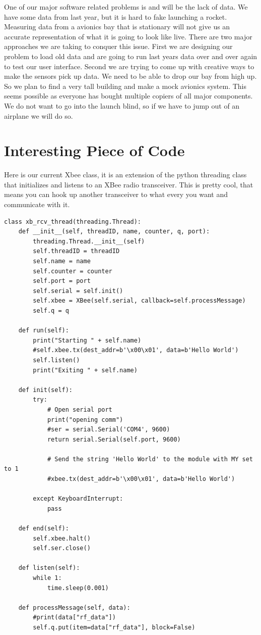 \documentclass[10pt,draftclsnofoot,onecolumn]{IEEEtran}
\begin{document}
One of our major software related problems is and will be the lack of data. We have some data from last year, but it is hard to fake launching a rocket. Measuring data from a avionics bay that is stationary will not give us an accurate representation of what it is going to look like live. There are two major approaches we are taking to conquer this issue. First we are designing our problem to load old data and are going to run last years data over and over again to test our user interface. Second we are trying to come up with creative ways to make the sensors pick up data. We need to be able to drop our bay from high up. So we plan to find a very tall building and make a mock avionics system. This seems possible as everyone has bought multiple copiers of all major components. We do not want to go into the launch blind, so if we have to jump out of an airplane we will do so. \par

\section{Interesting Piece of Code}
Here is our current Xbee class, it is an extension of the python threading class that initializes and listens to an XBee radio transceiver. This is pretty cool, that means you can hook up another transceiver to what every you want and communicate with it. \par

\begin{lstlisting}
class xb_rcv_thread(threading.Thread):
    def __init__(self, threadID, name, counter, q, port):
        threading.Thread.__init__(self)
        self.threadID = threadID
        self.name = name
        self.counter = counter
        self.port = port
        self.serial = self.init()
        self.xbee = XBee(self.serial, callback=self.processMessage)
        self.q = q

    def run(self):
        print("Starting " + self.name)
        #self.xbee.tx(dest_addr=b'\x00\x01', data=b'Hello World')
        self.listen()
        print("Exiting " + self.name)

    def init(self):
        try:
            # Open serial port
            print("opening comm")
            #ser = serial.Serial('COM4', 9600)
            return serial.Serial(self.port, 9600)

            # Send the string 'Hello World' to the module with MY set to 1
            #xbee.tx(dest_addr=b'\x00\x01', data=b'Hello World')
       
        except KeyboardInterrupt:
            pass

    def end(self):
        self.xbee.halt()
        self.ser.close()

    def listen(self):
        while 1:
            time.sleep(0.001)

    def processMessage(self, data):
        #print(data["rf_data"])
        self.q.put(item=data["rf_data"], block=False)

\end{lstlisting}
\pagebreak
\end{document}
